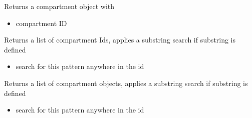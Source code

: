 \documentclass[letterpaper,10pt,english]{sphinxmanual}
\begin{document}
\begin{fulllineitems}
\begin{fulllineitems}
\begin{itemize}
\end{itemize}

\end{fulllineitems}


\begin{fulllineitems}
\label{\detokenize{modules_doc:cbmpy.CBModel.Model.getCompartment}}
\pysigstartsignatures
{}
\pysigstopsignatures
\sphinxAtStartPar
Returns a compartment object with 
\begin{itemize}
\item {} 
\sphinxAtStartPar
{} compartment ID

\end{itemize}

\end{fulllineitems}


\begin{fulllineitems}
\label{\detokenize{modules_doc:cbmpy.CBModel.Model.getCompartmentIds}}
\pysigstartsignatures
{}
\pysigstopsignatures
\sphinxAtStartPar
Returns a list of compartment Ids, applies a substring search if substring is defined
\begin{itemize}
\item {} 
\sphinxAtStartPar
{} search for this pattern anywhere in the id

\end{itemize}

\end{fulllineitems}


\begin{fulllineitems}
\label{\detokenize{modules_doc:cbmpy.CBModel.Model.getCompartmentObjects}}
\pysigstartsignatures
{}
\pysigstopsignatures
\sphinxAtStartPar
Returns a list of compartment objects, applies a substring search if substring is defined
\begin{itemize}
\item {} 
\sphinxAtStartPar
{} search for this pattern anywhere in the id


\end{itemize}
\end{fulllineitems}
\end{fulllineitems}
\end{document}
